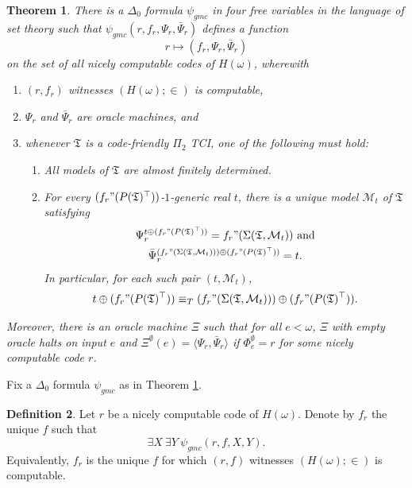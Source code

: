 \documentclass[12pt, twoside]{memoir}
\numberwithin{equation}{section}
\newtheorem{thm}{Theorem}[section]
\theoremstyle{definition}
\newtheorem{defi}[thm]{Definition}
\theoremstyle{remark}
\theoremstyle{definition}
\theoremstyle{definition}
\theoremstyle{definition}
\theoremstyle{remark}
\begin{document}
\begin{thm}\label{lastthm}
There is a $\Delta_0$ formula $\psi_{gmc}$ in four free variables in the language of set theory such that $\psi_{gmc}(r, f_r, \Psi_r, \bar{\Psi}_{r})$ defines a function $$r \mapsto (f_r, \Psi_r, \bar{\Psi}_{r})$$ on the set of all nicely computable codes of $H(\omega)$, wherewith
\begin{enumerate}[label=(\arabic*)]
    \item $(r, f_r)$ witnesses $(H(\omega); \in)$ is computable,
    \item $\Psi_r$ and $\bar{\Psi}_{r}$ are oracle machines, and
    \item whenever $\mathfrak{T}$ is a code-friendly $\Pi_2$ TCI, one of the following must hold:
    \begin{enumerate}[label=(\alph*)]
        \item All models of $\mathfrak{T}$ are almost finitely determined.
        \item For every $(f_r" (P(\mathfrak{T})^{\top}))$-$1$-generic real $t$, there is a unique model $\mathcal{M}_t$ of $\mathfrak{T}$ satisfying 
        \begin{gather*}
            \Psi_r^{t \oplus (f_r" (P(\mathfrak{T})^{\top}))} = f_r" (\Sigma(\mathfrak{T}, \mathcal{M}_t)) \text{ and} \\
            \bar{\Psi}_{r}^{(f_r" (\Sigma(\mathfrak{T}, \mathcal{M}_t))) \oplus (f_r" (P(\mathfrak{T})^{\top}))} = t.
        \end{gather*}
        In particular, for each such pair $(t, \mathcal{M}_t)$, $$t \oplus (f_r" (P(\mathfrak{T})^{\top})) \equiv_{T} (f_r" (\Sigma(\mathfrak{T}, \mathcal{M}_t))) \oplus (f_r" (P(\mathfrak{T})^{\top})).$$
\end{enumerate}
\end{enumerate}
Moreover, there is an oracle machine $\Xi$ such that for all $e < \omega$, $\Xi$ with empty oracle halts on input $e$ and $\Xi^{\emptyset}(e) = \langle \Psi_r, \bar{\Psi}_{r} \rangle$ if $\Phi^{\emptyset}_e = r$ for some nicely computable code $r$.
\end{thm}

Fix a $\Delta_0$ formula $\psi_{gmc}$ as in Theorem \ref{lastthm}.

\begin{defi}
Let $r$ be a nicely computable code of $H(\omega)$. Denote by $f_r$ the unique $f$ such that 
\begin{equation*}
    \exists X \ \exists Y \ \psi_{gmc}(r, f, X, Y) \text{.}
\end{equation*}
Equivalently, $f_r$ is the unique $f$ for which $(r, f)$ witnesses $(H(\omega); \in)$ is computable. 
\end{defi}
\end{document}
